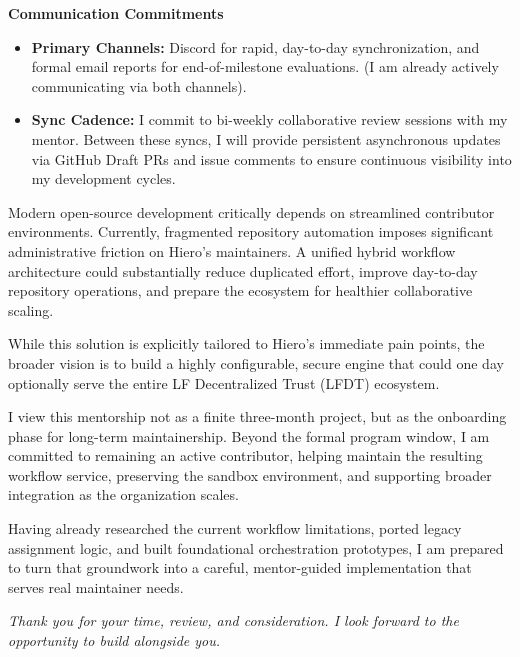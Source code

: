 \documentclass[11pt]{article}
\newcommand{\mainheading}[1]{\par\vspace{10pt}\noindent{\fontsize{15pt}{18pt}\selectfont\textcolor{headingblue}{#1}}
\par\vspace{4pt}}
\begin{document}
\textbf{Communication Commitments}
\begin{itemize}[leftmargin=18pt,itemsep=2pt,topsep=2pt]
    \item \textbf{Primary Channels:} Discord for rapid, day-to-day synchronization, and formal email reports for end-of-milestone evaluations. (I am already actively communicating via both channels).
    \item \textbf{Sync Cadence:} I commit to bi-weekly collaborative review sessions with my mentor. Between these syncs, I will provide persistent asynchronous updates via GitHub Draft PRs and issue comments to ensure continuous visibility into my development cycles.
\end{itemize}

\vspace{10pt}
\mainheading{11. Broader Vision \& Closing}

Modern open-source development critically depends on streamlined contributor environments. Currently, fragmented repository automation imposes significant administrative friction on Hiero's maintainers. A unified hybrid workflow architecture could substantially reduce duplicated effort, improve day-to-day repository operations, and prepare the ecosystem for healthier collaborative scaling.

While this solution is explicitly tailored to Hiero's immediate pain points, the broader vision is to build a highly configurable, secure engine that could one day optionally serve the entire LF Decentralized Trust (LFDT) ecosystem. 

I view this mentorship not as a finite three-month project, but as the onboarding phase for long-term maintainership. Beyond the formal program window, I am committed to remaining an active contributor, helping maintain the resulting workflow service, preserving the sandbox environment, and supporting broader integration as the organization scales.

Having already researched the current workflow limitations, ported legacy assignment logic, and built foundational orchestration prototypes, I am prepared to turn that groundwork into a careful, mentor-guided implementation that serves real maintainer needs.

\vspace{10pt}
\noindent
\textit{Thank you for your time, review, and consideration. I look forward to the opportunity to build alongside you.}

\vspace{20pt}
\mainheading{12. Availability Snapshot}
\end{document}
